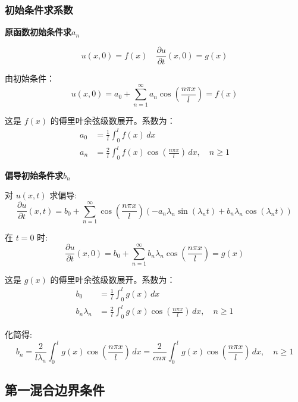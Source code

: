 \documentclass[12pt,a4paper]{article}
\numberwithin{subsection}{section}
\numberwithin{subsubsection}{subsection}
\theoremstyle{plain}
\theoremstyle{definition}
\theoremstyle{remark}
\begin{document}
	\subsubsection{初始条件求系数}
	\noindent
	\textbf{原函数初始条件求$a_n$}
	
	\begin{equation}
		u(x, 0) = f(x) \quad \frac{\partial u}{\partial t}(x, 0) = g(x)
	\end{equation}
	
	由初始条件：
	\begin{equation}
		u(x, 0) = a_0 + \sum_{n=1}^{\infty} a_n \cos\left(\frac{n\pi x}{l}\right) = f(x)
	\end{equation}
	
	这是 $f(x)$ 的傅里叶余弦级数展开。系数为：
	\begin{align}
		a_0 &= \frac{1}{l} \int_0^l f(x) \, dx \\
		a_n &= \frac{2}{l} \int_0^l f(x) \cos\left(\frac{n\pi x}{l}\right) \, dx, \quad n \ge 1
	\end{align}
	
	\noindent
	\textbf{偏导初始条件求$b_n$}
	
	对 $u(x,t)$ 求偏导:
	\begin{equation}
		\frac{\partial u}{\partial t}(x, t) = b_0 + \sum_{n=1}^{\infty} \cos\left(\frac{n\pi x}{l}\right) \left( -a_n \lambda_n \sin(\lambda_n t) + b_n \lambda_n \cos(\lambda_n t) \right)
	\end{equation}
	
	在 \(t = 0\) 时:
	\begin{equation}
		\frac{\partial u}{\partial t}(x, 0) = b_0 + \sum_{n=1}^{\infty} b_n \lambda_n \cos\left(\frac{n\pi x}{l}\right) = g(x)
	\end{equation}
	
	这是 $g(x)$ 的傅里叶余弦级数展开。系数为：
	\begin{align}
		b_0 &= \frac{1}{l} \int_0^l g(x) \, dx \\
		b_n \lambda_n &= \frac{2}{l} \int_0^l g(x) \cos\left(\frac{n\pi x}{l}\right) \, dx, \quad n \ge 1
	\end{align}
	
	化简得:
	\begin{equation}
		b_n = \frac{2}{l \lambda_n} \int_0^l g(x) \cos\left(\frac{n\pi x}{l}\right) \, dx = \frac{2}{cn\pi} \int_0^l g(x) \cos\left(\frac{n\pi x}{l}\right) \, dx, \quad n \ge 1
	\end{equation}
	
	
	\subsection{第一混合边界条件}
	
\end{document}
